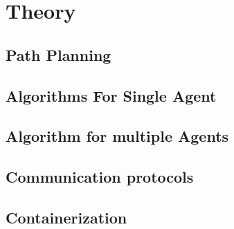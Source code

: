 \chapter{Theory}

\section{Path Planning}


\section{Algorithms For Single Agent}


\section{Algorithm for multiple Agents}


\section{Communication protocols}


\section{Containerization}
